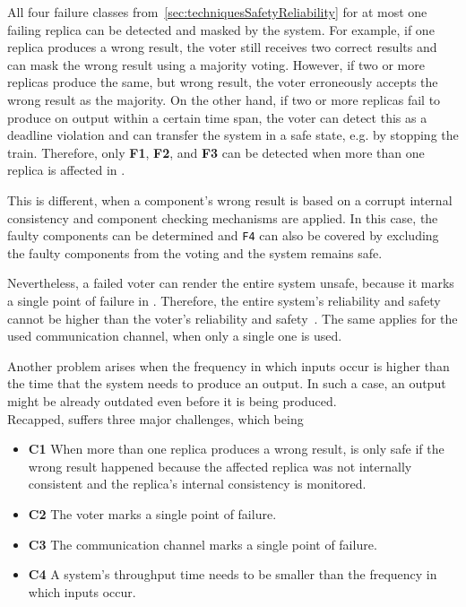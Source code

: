 All four failure classes from~\autoref{sec:techniquesSafetyReliability} for at most one failing replica can be detected and masked by the system.
For example, if one replica produces a wrong result, the voter still receives two correct results and can mask the wrong result using a majority voting.
However, if two or more replicas produce the same, but wrong result, the voter erroneously accepts the wrong result as the majority.
On the other hand, if two or more replicas fail to produce on output within a certain time span, the voter can detect this as a deadline violation and can transfer the system in a safe state, e.g. by stopping the train.
Therefore, only \textbf{F1}, \textbf{F2}, and \textbf{F3} can be detected when more than one replica is affected in .

This is different, when a component's wrong result is based on a corrupt internal consistency and component checking mechanisms are applied.
In this case, the faulty components can be determined and \texttt{F4} can also be covered by excluding the faulty components from the voting and the system remains safe.

Nevertheless, a failed voter can render the entire system unsafe, because it marks a single point of failure in .
Therefore, the entire system's reliability and safety cannot be higher than the voter's reliability and safety~\cite{ArifeenFaultTolerantTMR}.
The same applies for the used communication channel, when only a single one is used.

Another problem arises when the frequency in which inputs occur is higher than the time that the system needs to produce an output.
In such a case, an output might be already outdated even before it is being produced.
\\

Recapped,  suffers three major challenges, which being

\newcommand{\ChallengeWR}{\textbf{C1}\xspace}
\newcommand{\ChallengeVoter}{\textbf{C2}\xspace}
\newcommand{\ChallengeComm}{\textbf{C3}\xspace}
\newcommand{\ChallengeThrough}{\textbf{C4}\xspace}
\begin{itemize}
\item \ChallengeWR When more than one replica produces a wrong result,  is only safe if the wrong result happened because the affected replica was not internally consistent and the replica's internal consistency is monitored.
\item \ChallengeVoter The voter marks a single point of failure.
\item \ChallengeComm The communication channel marks a single point of failure.
\item \ChallengeThrough A system's throughput time needs to be smaller than the frequency in which inputs occur.
\end{itemize}

